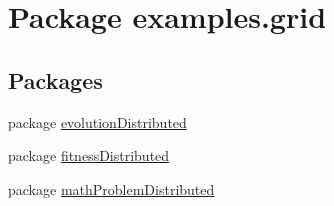 \hypertarget{namespaceexamples_1_1grid}{\section{Package examples.\-grid}
\label{namespaceexamples_1_1grid}
}
\subsection*{Packages}
\begin{DoxyCompactItemize}
\item 
package \hyperlink{namespaceexamples_1_1grid_1_1evolution_distributed}{evolution\-Distributed}
\item 
package \hyperlink{namespaceexamples_1_1grid_1_1fitness_distributed}{fitness\-Distributed}
\item 
package \hyperlink{namespaceexamples_1_1grid_1_1math_problem_distributed}{math\-Problem\-Distributed}
\end{DoxyCompactItemize}
